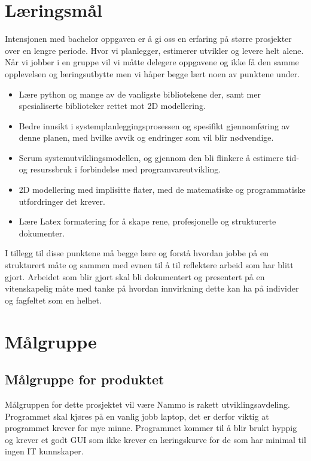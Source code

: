 \section{Læringsmål}
Intensjonen med bachelor oppgaven er å gi oss en erfaring på større prosjekter over en lengre periode. Hvor vi planlegger, estimerer utvikler og levere helt alene. Når vi jobber i en gruppe vil vi måtte delegere oppgavene og ikke få den samme opplevelsen og læringsutbytte men vi håper begge lært noen av punktene under.

\begin{itemize}

   \item    Lære python og mange av de vanligste bibliotekene der, samt mer spesialiserte biblioteker rettet mot 2D modellering.
   
   \item    Bedre innsikt i systemplanleggingsprosessen og spesifikt gjennomføring av denne planen, med hvilke avvik og endringer som vil blir nødvendige.
   
   \item    Scrum systemutviklingsmodellen, og gjennom den bli flinkere å estimere tid- og resurssbruk i forbindelse med programvareutvikling.
   
   \item    2D modellering med implisitte flater, med de matematiske og programmatiske utfordringer det krever.
   
   \item    Lære Latex formatering for å skape rene, profesjonelle og strukturerte dokumenter.
   
\end{itemize}
I tillegg til disse punktene må begge lære og forstå  hvordan jobbe på en strukturert måte og sammen med evnen til å til reflektere arbeid som har blitt gjort. Arbeidet som blir gjort skal bli dokumentert og presentert på en vitenskapelig måte med tanke på hvordan innvirkning dette kan ha på individer og fagfeltet som en helhet.

\section{Målgruppe}
\subsection{Målgruppe for produktet}
Målgruppen for dette prosjektet vil være Nammo is rakett utviklingsavdeling. Programmet skal kjøres på en vanlig jobb laptop, det er derfor viktig at programmet krever for mye minne.
Programmet kommer til å blir brukt hyppig og krever et godt GUI som ikke krever en læringskurve for de som har minimal til ingen IT kunnskaper.



